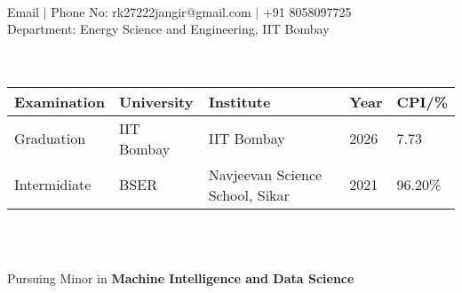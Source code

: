 \documentclass{article}
\begin{document}
\vspace*{-6cm}
\\  Email $\vert$ Phone No: rk27222jangir@gmail.com $\vert$ +91 8058097725\\     Department: Energy Science and Engineering, IIT Bombay            \\

\noindent {}\\[\lsep] \\
\begin{tabular}{ l @{\hskip 0.75in} l @{\hskip 0.75in} l @{\hskip 0.5in} l @{\hskip 0.25in} l }
\hline
\textbf{Examination} & \textbf{University} & \textbf{Institute} & \textbf{Year} & \textbf{CPI/\%} \\[0.025cm]

\hline
Graduation & IIT Bombay & IIT Bombay & 2026 & 7.73\\


Intermidiate & BSER & Navjeevan Science School, Sikar & 2021 & 96.20\%\\
\hline
\end{tabular}
\\[0.05cm]
\begin{table}
    \begin{minipage}{0.15\linewidth}
        \centering
    \end{minipage}
    \begin{minipage}{0.65\linewidth}
        \setlength{\tabcolsep}{70pt}
        \def\arraystretch{1.15}
        \begin{tabular}{ll}
        \end{tabular}
    \end{minipage}\hfill
\end{table} 

\vspace{-2.5pt}
\hspace{-0.6cm} Pursuing Minor in \textbf{Machine Intelligence and Data Science} 
\vspace{-15pt}
\end{document}
